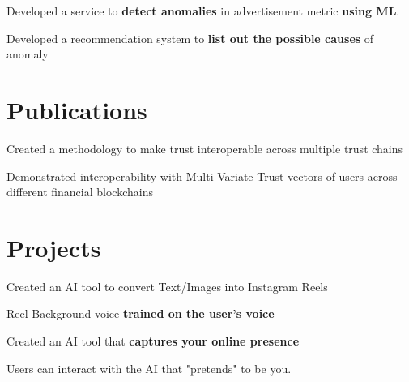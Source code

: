\documentclass[]{deedy-resume-openfont}
\begin{document}
\begin{minipage}[t]{0.66\textwidth}
{}
\begin{tightemize}
\item Developed a service to \textbf{detect anomalies} in advertisement metric \textbf{using ML}.
\item Developed a recommendation system to \textbf{list out the possible causes }of anomaly
\end{tightemize}



\section{Publications}
\begin{tightemize}
\item Created a methodology to make trust interoperable across multiple trust chains
\item Demonstrated interoperability with Multi-Variate Trust vectors of users across different financial blockchains
\end{tightemize}

\section{Projects}
\begin{tightemize}
\item Created an AI tool to convert Text/Images into Instagram Reels \\
\item Reel Background voice \textbf{trained on the user's voice}
\end{tightemize}
\sectionsep

\begin{tightemize}
\item Created an AI tool that \textbf{captures your online presence }\\
\item Users can interact with the AI that "pretends" to be you.
\end{tightemize}
\sectionsep


\end{minipage}
\end{document}
